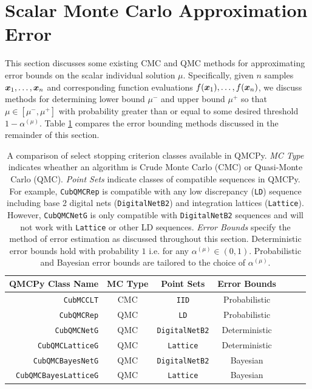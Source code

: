 \documentclass{article}[12pt]
\begin{document}
\section{Scalar Monte Carlo Approximation Error}\label{sec:Existing_QMC_Methods}

This section discusses some existing CMC and QMC methods for approximating error bounds on the scalar individual solution $\mu$. Specifically, given $n$ samples $\boldsymbol{x}_1,\dots,\boldsymbol{x}_n$ and corresponding function evaluations $f(\boldsymbol{x}_1),\dots,f(\boldsymbol{x}_n)$, we discuss methods for determining lower bound $\mu^-$ and upper bound $\mu^+$ so that $\mu \in [\mu^-,\mu^+]$ with probability greater than or equal to some desired threshold $1-\alpha^{(\mu)}$. Table \ref{table:qmcpy_sc} compares the error bounding methods discussed in the remainder of this section.

\begin{table}[t]
\centering
\begin{tabular}{r c c c c c c}
    QMCPy Class Name & MC Type & Point Sets & Error Bounds \\
    \hline
    \texttt{CubMCCLT} \cite{cubmcg} & CMC & \texttt{IID} & Probabilistic \\
    \texttt{CubQMCRep} \cite{mcbook} & QMC & \texttt{LD} & Probabilistic \\
    \texttt{CubQMCNetG} \cite{cubqmcsobol} & QMC & \texttt{DigitalNetB2} & Deterministic \\
    \texttt{CubQMCLatticeG} \cite{cubqmclattice} & QMC & \texttt{Lattice} & Deterministic \\
    \texttt{CubQMCBayesNetG} \cite{cubqmcbayes_thesis} & QMC &  \texttt{DigitalNetB2} & Bayesian \\
    \texttt{CubQMCBayesLatticeG} \cite{cubqmcbayeslattice} & QMC & \texttt{Lattice} & Bayesian \\
    \hline
\end{tabular}
\caption{A comparison of select stopping criterion classes available in QMCPy. \emph{MC Type} indicates wheather an algorithm is Crude Monte Carlo (CMC) or Quasi-Monte Carlo (QMC). \emph{Point Sets} indicate classes of compatible sequences in QMCPy. For example, \texttt{CubQMCRep} is compatible with any low discrepancy (\texttt{LD}) sequence including base 2 digital nets (\texttt{DigitalNetB2}) and integration lattices (\texttt{Lattice}). However, \texttt{CubQMCNetG} is only compatible with \texttt{DigitalNetB2} sequences and will not work with \texttt{Lattice} or other LD sequences. \emph{Error Bounds} specify the method of error estimation as discussed throughout this section. Deterministic error bounds hold with probability $1$ i.e. for any $\alpha^{(\mu)} \in (0,1)$. Probabilistic and Bayesian error bounds are tailored to the choice of $\alpha^{(\mu)}$.}
\label{table:qmcpy_sc}
\end{table}
\end{document}
